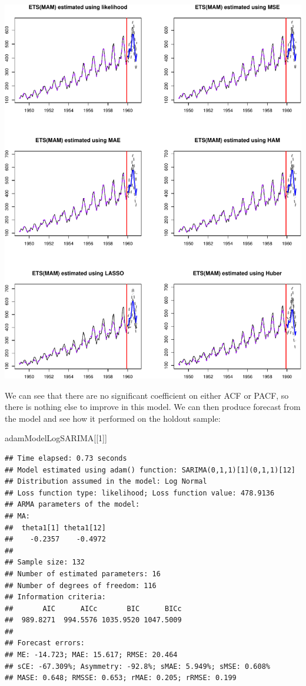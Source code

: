 \documentclass[
]{book}
\newenvironment{Shaded}{\begin{snugshade}}{\end{snugshade}}
\newcommand{\DecValTok}[1]{\textcolor[rgb]{0.00,0.00,0.81}{#1}}
\newcommand{\NormalTok}[1]{#1}
\theoremstyle{definition}
\theoremstyle{definition}
\theoremstyle{definition}
\theoremstyle{definition}
\theoremstyle{remark}
\begin{document}
\includegraphics{adam_files/figure-latex/unnamed-chunk-75-1.pdf}

We can see that there are no significant coefficient on either ACF or PACF, so there is nothing else to improve in this model. We can then produce forecast from the model and see how it performed on the holdout sample:

\begin{Shaded}
\begin{Highlighting}[]
\NormalTok{adamModelLogSARIMA[[}\DecValTok{1}\NormalTok{]]}
\end{Highlighting}
\end{Shaded}

\begin{verbatim}
## Time elapsed: 0.73 seconds
## Model estimated using adam() function: SARIMA(0,1,1)[1](0,1,1)[12]
## Distribution assumed in the model: Log Normal
## Loss function type: likelihood; Loss function value: 478.9136
## ARMA parameters of the model:
## MA:
##  theta1[1] theta1[12] 
##    -0.2357    -0.4972 
## 
## Sample size: 132
## Number of estimated parameters: 16
## Number of degrees of freedom: 116
## Information criteria:
##       AIC      AICc       BIC      BICc 
##  989.8271  994.5576 1035.9520 1047.5009 
## 
## Forecast errors:
## ME: -14.723; MAE: 15.617; RMSE: 20.464
## sCE: -67.309%; Asymmetry: -92.8%; sMAE: 5.949%; sMSE: 0.608%
## MASE: 0.648; RMSSE: 0.653; rMAE: 0.205; rRMSE: 0.199
\end{verbatim}
\end{document}
